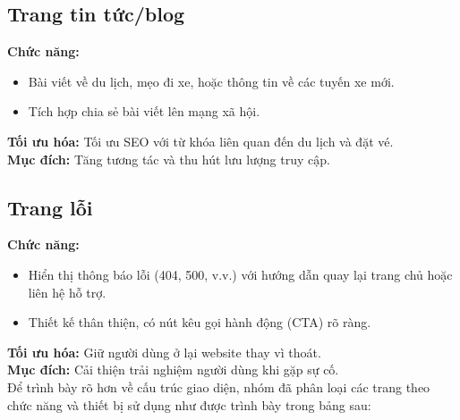 \subsection*{Trang tin tức/blog}
\textbf{Chức năng:}
\begin{itemize}
    \item Bài viết về du lịch, mẹo đi xe, hoặc thông tin về các tuyến xe mới.
    \item Tích hợp chia sẻ bài viết lên mạng xã hội.
\end{itemize}
\textbf{Tối ưu hóa:} Tối ưu SEO với từ khóa liên quan đến du lịch và đặt vé.\\
\textbf{Mục đích:} Tăng tương tác và thu hút lưu lượng truy cập.



\subsection*{Trang lỗi}
\textbf{Chức năng:}
\begin{itemize}
    \item Hiển thị thông báo lỗi (404, 500, v.v.) với hướng dẫn quay lại trang chủ hoặc liên hệ hỗ trợ.
    \item Thiết kế thân thiện, có nút kêu gọi hành động (CTA) rõ ràng.
\end{itemize}
\textbf{Tối ưu hóa:} Giữ người dùng ở lại website thay vì thoát.\\
\textbf{Mục đích:} Cải thiện trải nghiệm người dùng khi gặp sự cố.\\

Để trình bày rõ hơn về cấu trúc giao diện, nhóm đã phân loại các trang theo chức năng và thiết bị sử dụng như được trình bày trong bảng sau:


